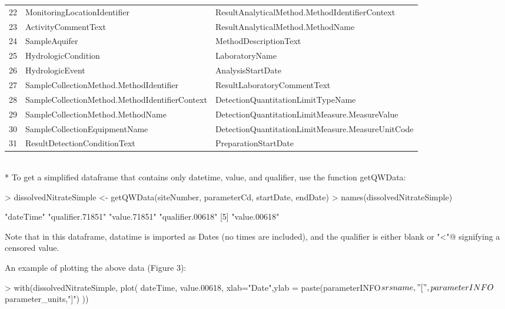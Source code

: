 \documentclass[a4paper,11pt]{article}
\begin{document}
\begin{tabular}{rll}
  22 & MonitoringLocationIdentifier & ResultAnalyticalMethod.MethodIdentifierContext \\ 
  23 & ActivityCommentText & ResultAnalyticalMethod.MethodName \\ 
  24 & SampleAquifer & MethodDescriptionText \\ 
  25 & HydrologicCondition & LaboratoryName \\ 
  26 & HydrologicEvent & AnalysisStartDate \\ 
  27 & SampleCollectionMethod.MethodIdentifier & ResultLaboratoryCommentText \\ 
  28 & SampleCollectionMethod.MethodIdentifierContext & DetectionQuantitationLimitTypeName \\ 
  29 & SampleCollectionMethod.MethodName & DetectionQuantitationLimitMeasure.MeasureValue \\ 
  30 & SampleCollectionEquipmentName & DetectionQuantitationLimitMeasure.MeasureUnitCode \\ 
  31 & ResultDetectionConditionText & PreparationStartDate \\ 
   \hline
\end{tabular}
\\*
To get a simplified dataframe that contains only datetime, value, and qualifier, use the function getQWData:

\begin{Schunk}
\begin{Sinput}
> dissolvedNitrateSimple <- getQWData(siteNumber, parameterCd, 
         startDate, endDate)
> names(dissolvedNitrateSimple)
\end{Sinput}
\begin{Soutput}
[1] "dateTime"        "qualifier.71851" "value.71851"     "qualifier.00618"
[5] "value.00618"    
\end{Soutput}
\end{Schunk}
Note that in this dataframe, datatime is imported as Dates (no times are included), and the qualifier is either blank or \verb@"<"@ signifying a censored value.

An example of plotting the above data (Figure 3):

\begin{Schunk}
\begin{Sinput}
> with(dissolvedNitrateSimple, plot(
   dateTime, value.00618,
   xlab="Date",ylab = paste(parameterINFO$srsname,
       "[",parameterINFO$parameter_units,"]")
   ))
\end{Sinput}
\end{Schunk}
\end{document}
